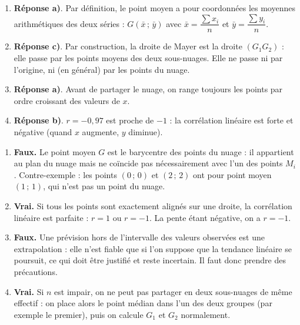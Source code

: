 \documentclass[11pt]{article}
\newcommand{\cle}[1]{{\popxbold\color{popdark}#1}}
\newcounter{popsec}
\newcounter{popsub}
\newcommand{\courssub}[1]{%
  \stepcounter{popsub}%
  \par\vspace{9pt}\noindent{\popxbold\fontsize{11.5}{13}\selectfont\color{popink}{\color{poporange}\thepopsec.\thepopsub}\hspace{6pt}#1}\par\nopagebreak\vspace{4pt}
}
\begin{document}
\courssub{Je vérifie mes connaissances}

\begin{corrige}
\begin{enumerate}
\item \textbf{Réponse a)}. Par définition, le point moyen a pour coordonnées les moyennes arithmétiques des deux séries : $G\left(\bar{x}\,;\,\bar{y}\right)$ avec $\bar{x}=\dfrac{\sum x_i}{n}$ et $\bar{y}=\dfrac{\sum y_i}{n}$.
\item \textbf{Réponse c)}. Par construction, la droite de Mayer est la droite $(G_1G_2)$ : elle passe par les points moyens des deux sous-nuages. Elle ne passe ni par l'origine, ni (en général) par les points du nuage.
\item \textbf{Réponse a)}. Avant de partager le nuage, on range toujours les points par ordre \cle{croissant des valeurs de $x$}.
\item \textbf{Réponse b)}. $r=-0{,}97$ est proche de $-1$ : la corrélation linéaire est \cle{forte} et \cle{négative} (quand $x$ augmente, $y$ diminue).
\end{enumerate}
\end{corrige}

\begin{corrige}
\begin{enumerate}
\item \textbf{Faux.} Le point moyen $G$ est le barycentre des points du nuage : il appartient au plan du nuage mais ne coïncide pas nécessairement avec l'un des points $M_i$. Contre-exemple : les points $(0\,;\,0)$ et $(2\,;\,2)$ ont pour point moyen $(1\,;\,1)$, qui n'est pas un point du nuage.
\item \textbf{Vrai.} Si tous les points sont exactement alignés sur une droite, la corrélation linéaire est parfaite : $r=1$ ou $r=-1$. La pente étant négative, on a $r=-1$.
\item \textbf{Faux.} Une prévision hors de l'intervalle des valeurs observées est une \cle{extrapolation} : elle n'est fiable que si l'on suppose que la tendance linéaire se poursuit, ce qui doit être justifié et reste incertain. Il faut donc prendre des précautions.
\item \textbf{Vrai.} Si $n$ est impair, on ne peut pas partager en deux sous-nuages de même effectif : on place alors le point médian dans l'un des deux groupes (par exemple le premier), puis on calcule $G_1$ et $G_2$ normalement.
\end{enumerate}
\end{corrige}
\end{document}
